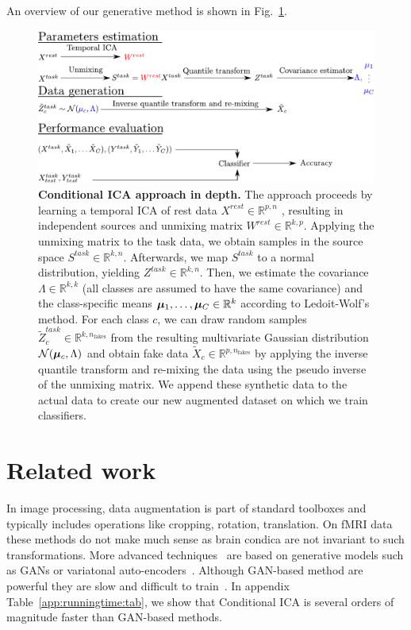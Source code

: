An overview of our generative method is shown in Fig.~\ref{Fig11}.
%
\begin{figure}
\centerline{\includegraphics[width=1\textwidth]{figures/condica/method_figure}}
\caption{\textbf{Conditional ICA approach in depth.} 
The approach proceeds by learning a temporal ICA of rest data $X^{rest} \in
\mathbb{R}^{p, n}$ , resulting in
independent sources and unmixing matrix $W^{rest} \in \mathbb{R}^{k, p}$.
%
Applying the unmixing matrix to the task data, we obtain samples in the source
space $S^{task} \in \mathbb{R}^{k, n}$.
%
Afterwards, we map $S^{task}$ to a normal distribution, yielding $Z^{task} \in
\mathbb{R}^{k, n}$. 
%
Then, we estimate the covariance $\Lambda \in \mathbb{R}^{k, k}$ (all classes are assumed to have the
same covariance) and the class-specific means $\boldsymbol{\mu}_1, \dots, \boldsymbol{\mu}_C \in \mathbb{R}^{k}$ according to Ledoit-Wolf's method.
%
For each class $c$, we can draw random samples $\tilde{Z}^{task}_c \in
\mathbb{R}^{k, n_{\mathrm{fakes}}}$ from the
resulting multivariate Gaussian distribution $\mathcal{N}(\boldsymbol{\mu}_c, \Lambda)$ and
obtain fake data $\tilde{X}_c  \in
\mathbb{R}^{p, n_{\mathrm{fakes}}}$
by applying the inverse quantile transform and re-mixing the data using the pseudo inverse of the unmixing matrix.
%
We append these synthetic data to the actual data to create our new augmented
dataset on which we train classifiers.}
\label{Fig11}
\end{figure}
%

\section{Related work}
In image processing, data augmentation is part of standard toolboxes and
typically includes operations like cropping, rotation, translation.
%
On fMRI data these methods do not make much sense as brain condica are not invariant to such transformations.
%
More advanced techniques~\cite{zhuang2019fmri}%
are based on generative models such as GANs or variatonal
auto-encoders~\cite{kingma2013auto}. Although GAN-based method are powerful they are slow and difficult to train~\cite{arjovsky_wasserstein_2017}. In
appendix Table~\ref{app:runningtime:tab}, we show that Conditional ICA is several orders of magnitude faster than GAN-based methods.

